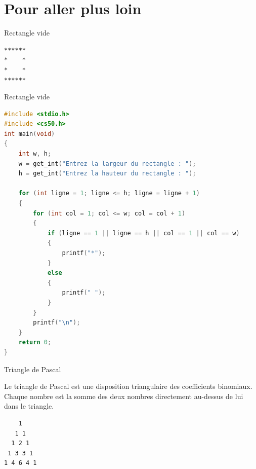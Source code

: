 \section{Pour aller plus loin}

\begin{UPSTIexercice}{Rectangle vide}
    \begin{minipage}{0.8\textwidth}
    \end{minipage}%
    \hfill
    \begin{minipage}{0.1\textwidth}
        \begin{verbatim}
******
*    *
*    *
******
        \end{verbatim}
    \end{minipage}
\end{UPSTIexercice}

\begin{UPSTIprofOnlyEnv}
    \begin{UPSTIcorrectionP}{Rectangle vide}
        \begin{lstlisting}[language=C]
#include <stdio.h>
#include <cs50.h>
int main(void)
{
    int w, h;
    w = get_int("Entrez la largeur du rectangle : ");
    h = get_int("Entrez la hauteur du rectangle : ");

    for (int ligne = 1; ligne <= h; ligne = ligne + 1)
    {
        for (int col = 1; col <= w; col = col + 1)
        {
            if (ligne == 1 || ligne == h || col == 1 || col == w)
            {
                printf("*");
            }
            else
            {
                printf(" ");
            }
        }
        printf("\n");
    }
    return 0;
}
        \end{lstlisting}
    \end{UPSTIcorrectionP}
\end{UPSTIprofOnlyEnv}


\begin{UPSTIexercice}{Triangle de Pascal}
    \begin{minipage}{0.8\textwidth}
        Le triangle de Pascal est une disposition triangulaire des coefficients binomiaux. Chaque nombre est la somme des deux nombres directement au-dessus de lui dans le triangle.\\
    \end{minipage}
    \hfill
    \begin{minipage}{0.15\textwidth}
        \begin{verbatim}
    1
   1 1
  1 2 1
 1 3 3 1
1 4 6 4 1
        \end{verbatim}
    \end{minipage}
\end{UPSTIexercice}


